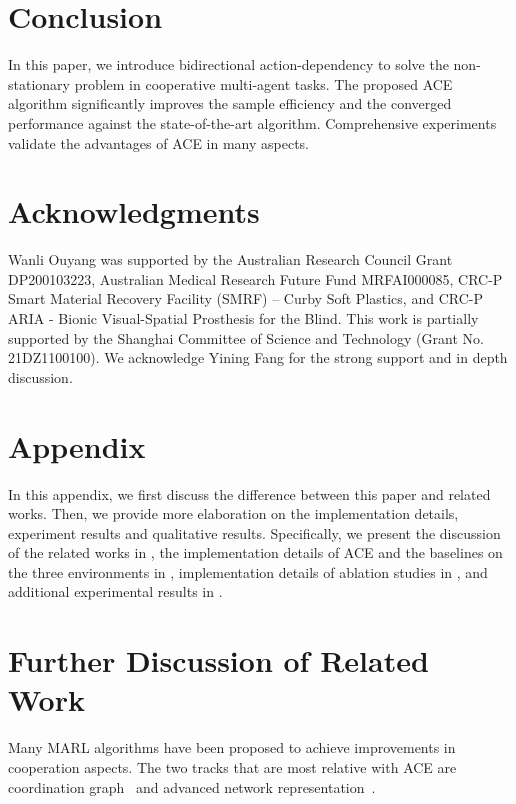 \documentclass[letterpaper]{article} \usepackage{aaai23}  \usepackage{times}  \usepackage{helvet}  \usepackage{courier}  \usepackage[hyphens]{url}  \usepackage{graphicx} \urlstyle{rm} \def\UrlFont{\rm}  \usepackage{natbib}  \usepackage{caption} \frenchspacing  \setlength{\pdfpagewidth}{8.5in} \setlength{\pdfpageheight}{11in} \usepackage{algorithm}
\begin{document}
 \section{Conclusion}
In this paper, we introduce bidirectional action-dependency to solve the non-stationary problem in cooperative multi-agent tasks. The proposed ACE algorithm significantly improves the sample efficiency and the converged performance against the state-of-the-art algorithm. Comprehensive experiments validate the advantages of ACE in many aspects.  
\section{Acknowledgments}
Wanli Ouyang was supported by the Australian Research Council Grant DP200103223, Australian Medical Research Future Fund MRFAI000085, CRC-P Smart Material Recovery Facility (SMRF) – Curby Soft Plastics, and CRC-P ARIA - Bionic Visual-Spatial Prosthesis for the Blind.
This work is partially supported by the Shanghai Committee of Science and Technology (Grant No. 21DZ1100100).
We acknowledge Yining Fang for the strong support and in depth discussion.

\clearpage

\clearpage
\clearpage
\section{Appendix}
In this appendix, we first discuss the difference between this paper and related works. Then, we provide more elaboration on the implementation details, experiment results and qualitative results.
Specifically, we present the discussion of the related works in , the implementation details of ACE and the baselines on the three environments in ,
implementation details of ablation studies in ,
and additional experimental results in .

\section{Further Discussion of Related Work}
\label{sec: rlt_discussion}

Many MARL algorithms have been proposed to achieve improvements in cooperation aspects. The two tracks that are most relative with ACE are coordination graph~\citeyear{zhang2011coordinated, zhang2013coordinating, bohmer2020deep} and advanced network representation~\citeyear{wang2019action}.
\end{document}
